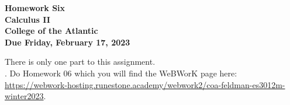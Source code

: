 \documentclass[12pt]{article}
\begin{document}
\pagestyle{empty}
 
\begin{center}
{\LARGE {\bf Homework Six}}\\
\bigskip
{\Large {\bf Calculus II}}\\
\bigskip
{\Large {\bf College of the Atlantic}}\\
\bigskip
{ {\bf Due Friday, February 17, 2023}}\\ 
\end{center}
\medskip


\noindent There is only one part to this assignment.\\

.  Do Homework 06 which you
will find the WeBWorK page here:
\url{https://webwork-hosting.runestone.academy/webwork2/coa-feldman-es3012m-winter2023}.





\end{document}
